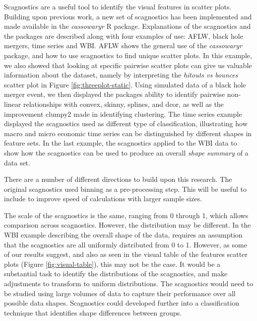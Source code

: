Scagnostics are a useful tool to identify the visual features in scatter
plots. Building upon previous work, a new set of scagnostics has been
implemented and made available in the \emph{cassowaryr} R package.
Explanations of the scagnostics and the packages are described along
with four examples of use: AFLW, black hole mergers, time series and
WBI. AFLW shows the general use of the \emph{cassowaryr} package, and
how to use scagnostics to find unique scatter plots. In this example, we
also showed that looking at specific pairwise scatter plots can give us
valuable information about the dataset, namely by interpreting the
\emph{hitouts vs bounces} scatter plot in Figure
\ref{fig:threeplot-static}. Using simulated data of a black hole merger
event, we then displayed the packages ability to identify pairwise
non-linear relationships with convex, skinny, splines, and dcor, as well
as the improvement clumpy2 made in identifying clustering. The time
series example displayed the scagnostics used as different type of
classification, illustrating how macro and micro economic time series
can be distinguished by different shapes in feature sets. In the last
example, the scagnostics applied to the WBI data to show how the
scagnostics can be used to produce an overall \emph{shape summary} of a
data set.

There are a number of different directions to build upon this research.
The original scagnostics used binning as a pre-processing step. This
will be useful to include to improve speed of calculations with larger
sample sizes.

The scale of the scagnostics is the same, ranging from 0 through 1,
which allows comparison across scagnostics. However, the distribution
may be different. In the WBI example describing the overall shape of the
data, requires an assumption that the scagnostics are all uniformly
distributed from 0 to 1. However, as some of our results suggest, and
also as seen in the visual table of the features scatter plots (Figure
\ref{fig:visual-table}), this may not be the case. It would be a
substantial task to identify the distributions of the scagnostics, and
make adjustments to transform to uniform distributions. The scagnostics
would need to be studied using large volumes of data to capture their
performance over all possible data shapes. Scagnostics could developed
further into a classification technique that identifies shape
differences between groups.

